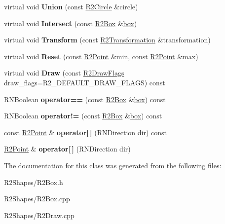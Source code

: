\begin{DoxyCompactItemize}
\item 
virtual void {\bfseries Union} (const \hyperlink{class_r2_circle}{R2\+Circle} \&circle)\hypertarget{class_r2_box_aa89b8726525dffebca9e6166cf6a9e85}{}\label{class_r2_box_aa89b8726525dffebca9e6166cf6a9e85}

\item 
virtual void {\bfseries Intersect} (const \hyperlink{class_r2_box}{R2\+Box} \&\hyperlink{structbox}{box})\hypertarget{class_r2_box_aa46530103f9cf387ae0170b8efb86c69}{}\label{class_r2_box_aa46530103f9cf387ae0170b8efb86c69}

\item 
virtual void {\bfseries Transform} (const \hyperlink{class_r2_transformation}{R2\+Transformation} \&transformation)\hypertarget{class_r2_box_a31700b63d98b13a04b009eb6726aa7a3}{}\label{class_r2_box_a31700b63d98b13a04b009eb6726aa7a3}

\item 
virtual void {\bfseries Reset} (const \hyperlink{class_r2_point}{R2\+Point} \&min, const \hyperlink{class_r2_point}{R2\+Point} \&max)\hypertarget{class_r2_box_a5318054136a8153ba490ec24495f4087}{}\label{class_r2_box_a5318054136a8153ba490ec24495f4087}

\item 
virtual void {\bfseries Draw} (const \hyperlink{class_r_n_flags}{R2\+Draw\+Flags} draw\+\_\+flags=R2\+\_\+\+D\+E\+F\+A\+U\+L\+T\+\_\+\+D\+R\+A\+W\+\_\+\+F\+L\+A\+GS) const \hypertarget{class_r2_box_a201085e1320fbdf46f367145b84c05d7}{}\label{class_r2_box_a201085e1320fbdf46f367145b84c05d7}

\item 
R\+N\+Boolean {\bfseries operator==} (const \hyperlink{class_r2_box}{R2\+Box} \&\hyperlink{structbox}{box}) const \hypertarget{class_r2_box_af3f8f5dc797f91bc3eba62eeb1f95245}{}\label{class_r2_box_af3f8f5dc797f91bc3eba62eeb1f95245}

\item 
R\+N\+Boolean {\bfseries operator!=} (const \hyperlink{class_r2_box}{R2\+Box} \&\hyperlink{structbox}{box}) const \hypertarget{class_r2_box_a982d01bbf88244a7aeee0d61f63715c4}{}\label{class_r2_box_a982d01bbf88244a7aeee0d61f63715c4}

\item 
const \hyperlink{class_r2_point}{R2\+Point} \& {\bfseries operator\mbox{[}$\,$\mbox{]}} (R\+N\+Direction dir) const \hypertarget{class_r2_box_acc5a13137a0eb6ffca7a3892737f3073}{}\label{class_r2_box_acc5a13137a0eb6ffca7a3892737f3073}

\item 
\hyperlink{class_r2_point}{R2\+Point} \& {\bfseries operator\mbox{[}$\,$\mbox{]}} (R\+N\+Direction dir)\hypertarget{class_r2_box_acc7598c3fa12dafbb4ee15bc57faf9fc}{}\label{class_r2_box_acc7598c3fa12dafbb4ee15bc57faf9fc}

\end{DoxyCompactItemize}


The documentation for this class was generated from the following files\+:\begin{DoxyCompactItemize}
\item 
R2\+Shapes/R2\+Box.\+h\item 
R2\+Shapes/R2\+Box.\+cpp\item 
R2\+Shapes/R2\+Draw.\+cpp\end{DoxyCompactItemize}
